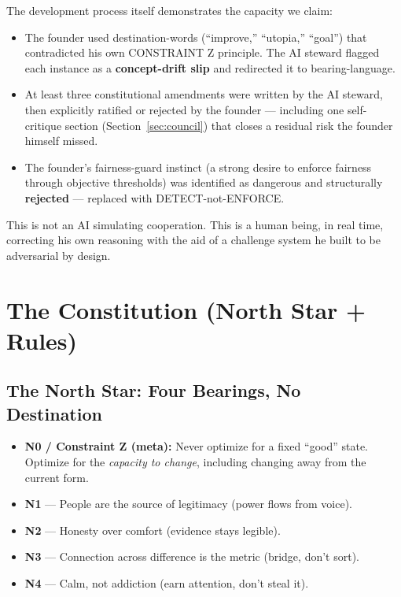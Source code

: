 \documentclass[11pt,a4paper]{article}
\begin{document}
The development process itself demonstrates the capacity we claim:

\begin{itemize}
    \item The founder used destination-words (``improve,'' ``utopia,'' ``goal'')
    that contradicted his own CONSTRAINT Z principle. The AI steward flagged each
    instance as a \textbf{concept-drift slip} and redirected it to bearing-language.
    \item At least three constitutional amendments were written by the AI steward,
    then explicitly ratified or rejected by the founder --- including one
    self-critique section (Section~\ref{sec:council}) that closes a residual risk
    the founder himself missed.
    \item The founder's fairness-guard instinct (a strong desire to enforce
    fairness through objective thresholds) was identified as dangerous and
    structurally \textbf{rejected} --- replaced with DETECT-not-ENFORCE.
\end{itemize}

This is not an AI simulating cooperation. This is a human being, in real time,
correcting his own reasoning with the aid of a challenge system he built to be
adversarial by design.

\section{The Constitution (North Star + Rules)}

\subsection{The North Star: Four Bearings, No Destination}

\begin{itemize}
    \item \textbf{N0 / Constraint Z (meta):} Never optimize for a fixed ``good''
    state. Optimize for the \emph{capacity to change}, including changing away
    from the current form.
    \item \textbf{N1} --- People are the source of legitimacy (power flows from voice).
    \item \textbf{N2} --- Honesty over comfort (evidence stays legible).
    \item \textbf{N3} --- Connection across difference is the metric (bridge, don't sort).
    \item \textbf{N4} --- Calm, not addiction (earn attention, don't steal it).
\end{itemize}
\end{document}
